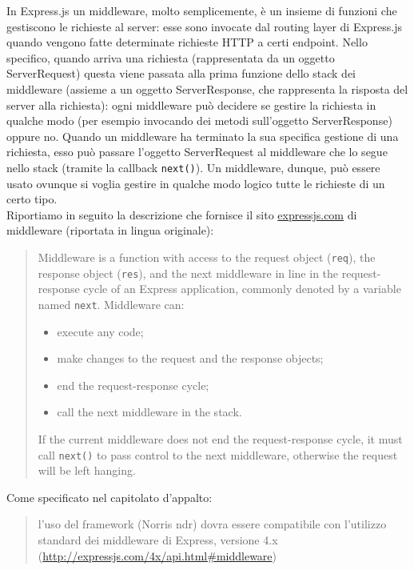  \label{app:express}
		In Express.js un middleware, molto semplicemente, è un insieme di funzioni che gestiscono le richieste al server: esse sono invocate dal routing layer di Express.js quando vengono fatte determinate richieste HTTP a certi endpoint. Nello specifico, quando arriva una richiesta (rappresentata da un oggetto ServerRequest) questa viene passata alla prima funzione dello stack dei middleware (assieme a un oggetto ServerResponse, che rappresenta la risposta del server alla richiesta): ogni middleware può decidere se gestire la richiesta in qualche modo (per esempio invocando dei metodi sull'oggetto ServerResponse) oppure no. Quando un middleware ha terminato la sua specifica gestione di una richiesta, esso può passare l'oggetto ServerRequest al middleware che lo segue nello stack (tramite la callback \texttt{next()}). Un middleware, dunque, può essere usato ovunque si voglia gestire in qualche modo logico tutte le richieste di un certo tipo.\\
		Riportiamo in seguito la descrizione che fornisce il sito \url{expressjs.com} di middleware (riportata in lingua originale):
		\begin{quote}
			Middleware is a function with access to the request object (\texttt{req}), the response object (\texttt{res}), and the next middleware in line in the request-response cycle of an Express application, commonly denoted by a variable named \texttt{next}. Middleware can:
			\begin{itemize}
				\item execute any code;
				\item make changes to the request and the response objects;
				\item end the request-response cycle;
				\item call the next middleware in the stack.
			\end{itemize}
			If the current middleware does not end the request-response cycle, it must call \texttt{next()} to pass control to the next middleware, otherwise the request will be left hanging.
		\end{quote}
		Come specificato nel capitolato d'appalto:
		\begin{quote}
			l'uso del framework (Norris ndr) dovra essere compatibile con l’utilizzo standard dei middleware di Express, versione 4.x (\url{http://expressjs.com/4x/api.html#middleware})
		\end{quote}
